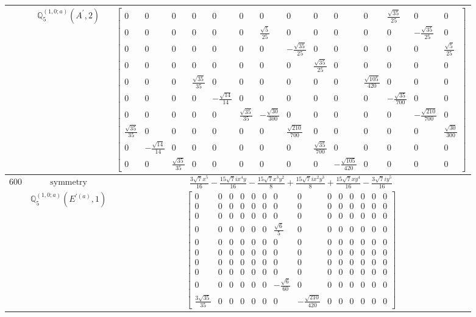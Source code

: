 \documentclass[fleqn,8pt,landscape]{jsarticle}
\begin{document}
\begin{longtable}{ccc}
$  $ & $ \mathbb{Q}_{5}^{(1,0;a)}(A^{\prime},2) $ & $ \begin{bmatrix} 0 & 0 & 0 & 0 & 0 & 0 & 0 & 0 & 0 & 0 & 0 & \frac{\sqrt{35}}{25} & 0 & 0 \\ 0 & 0 & 0 & 0 & 0 & 0 & \frac{\sqrt{5}}{25} & 0 & 0 & 0 & 0 & 0 & - \frac{\sqrt{35}}{25} & 0 \\ 0 & 0 & 0 & 0 & 0 & 0 & 0 & - \frac{\sqrt{35}}{25} & 0 & 0 & 0 & 0 & 0 & \frac{\sqrt{5}}{25} \\ 0 & 0 & 0 & 0 & 0 & 0 & 0 & 0 & \frac{\sqrt{35}}{25} & 0 & 0 & 0 & 0 & 0 \\ 0 & 0 & 0 & \frac{\sqrt{35}}{35} & 0 & 0 & 0 & 0 & 0 & 0 & \frac{\sqrt{105}}{420} & 0 & 0 & 0 \\ 0 & 0 & 0 & 0 & - \frac{\sqrt{14}}{14} & 0 & 0 & 0 & 0 & 0 & 0 & - \frac{\sqrt{35}}{700} & 0 & 0 \\ 0 & 0 & 0 & 0 & 0 & \frac{\sqrt{35}}{35} & - \frac{\sqrt{30}}{300} & 0 & 0 & 0 & 0 & 0 & - \frac{\sqrt{210}}{700} & 0 \\ \frac{\sqrt{35}}{35} & 0 & 0 & 0 & 0 & 0 & 0 & \frac{\sqrt{210}}{700} & 0 & 0 & 0 & 0 & 0 & \frac{\sqrt{30}}{300} \\ 0 & - \frac{\sqrt{14}}{14} & 0 & 0 & 0 & 0 & 0 & 0 & \frac{\sqrt{35}}{700} & 0 & 0 & 0 & 0 & 0 \\ 0 & 0 & \frac{\sqrt{35}}{35} & 0 & 0 & 0 & 0 & 0 & 0 & - \frac{\sqrt{105}}{420} & 0 & 0 & 0 & 0 \end{bmatrix} $ \\ \hline
$ 600 $ & $ \text{symmetry} $ & $ \frac{3 \sqrt{7} x^{5}}{16} - \frac{15 \sqrt{7} i x^{4} y}{16} - \frac{15 \sqrt{7} x^{3} y^{2}}{8} + \frac{15 \sqrt{7} i x^{2} y^{3}}{8} + \frac{15 \sqrt{7} x y^{4}}{16} - \frac{3 \sqrt{7} i y^{5}}{16} $ \\
$  $ & $ \mathbb{Q}_{5}^{(1,0;a)}(E^{\prime(a)},1) $ & $ \begin{bmatrix} 0 & 0 & 0 & 0 & 0 & 0 & 0 & 0 & 0 & 0 & 0 & 0 & 0 & 0 \\ 0 & 0 & 0 & 0 & 0 & 0 & 0 & 0 & 0 & 0 & 0 & 0 & 0 & 0 \\ 0 & 0 & 0 & 0 & 0 & 0 & 0 & 0 & 0 & 0 & 0 & 0 & 0 & 0 \\ 0 & 0 & 0 & 0 & 0 & 0 & \frac{\sqrt{6}}{5} & 0 & 0 & 0 & 0 & 0 & 0 & 0 \\ 0 & 0 & 0 & 0 & 0 & 0 & 0 & 0 & 0 & 0 & 0 & 0 & 0 & 0 \\ 0 & 0 & 0 & 0 & 0 & 0 & 0 & 0 & 0 & 0 & 0 & 0 & 0 & 0 \\ 0 & 0 & 0 & 0 & 0 & 0 & 0 & 0 & 0 & 0 & 0 & 0 & 0 & 0 \\ 0 & 0 & 0 & 0 & 0 & 0 & 0 & 0 & 0 & 0 & 0 & 0 & 0 & 0 \\ 0 & 0 & 0 & 0 & 0 & 0 & - \frac{\sqrt{6}}{60} & 0 & 0 & 0 & 0 & 0 & 0 & 0 \\ \frac{3 \sqrt{35}}{35} & 0 & 0 & 0 & 0 & 0 & 0 & - \frac{\sqrt{210}}{420} & 0 & 0 & 0 & 0 & 0 & 0 \end{bmatrix} $ \\ \hline

\end{longtable}
\end{document}
